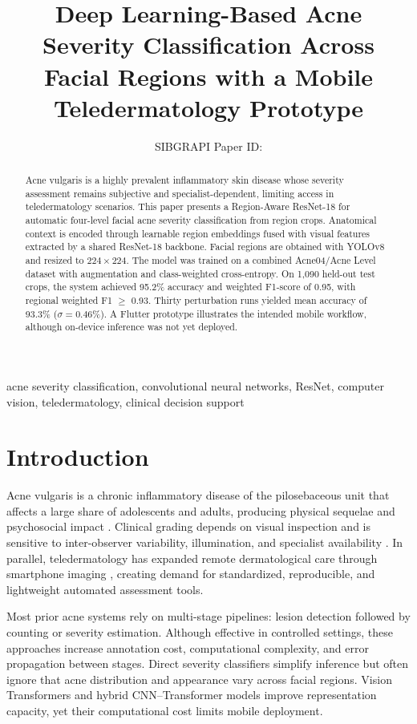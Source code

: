 \documentclass[10pt,conference]{IEEEtran}
\title{Deep Learning-Based Acne Severity Classification Across Facial Regions with a Mobile Teledermatology Prototype}
\author{
\IEEEauthorblockN{Lucas Gonzaga Andrade}
\IEEEauthorblockA{Federal Institute of Education, Science and Technology of Cear\'a (IFCE)\\
Fortaleza, CE, Brazil}
\and
\IEEEauthorblockN{Roger Moura Sarmento}
\IEEEauthorblockA{Federal Institute of Education, Science and Technology of Cear\'a (IFCE)\\
Fortaleza, CE, Brazil}
}
\author{SIBGRAPI Paper ID: \cmtid \\ }
\newif\iffinal
\begin{document}
\maketitle
\iffinal\else\linenumbers\fi

\begin{abstract}
Acne vulgaris is a highly prevalent inflammatory skin disease whose severity assessment remains subjective and specialist-dependent, limiting access in teledermatology scenarios. This paper presents a Region-Aware ResNet-18 for automatic four-level facial acne severity classification from region crops. Anatomical context is encoded through learnable region embeddings fused with visual features extracted by a shared ResNet-18 backbone. Facial regions are obtained with YOLOv8 and resized to $224\times224$. The model was trained on a combined Acne04/Acne Level dataset with augmentation and class-weighted cross-entropy. On 1{,}090 held-out test crops, the system achieved 95.2\% accuracy and weighted F1-score of 0.95, with regional weighted F1 $\geq$ 0.93. Thirty perturbation runs yielded mean accuracy of 93.3\% ($\sigma=0.46\%$). A Flutter prototype illustrates the intended mobile workflow, although on-device inference was not yet deployed.
\end{abstract}

\begin{IEEEkeywords}
acne severity classification, convolutional neural networks, ResNet, computer vision, teledermatology, clinical decision support
\end{IEEEkeywords}

\section{Introduction}
Acne vulgaris is a chronic inflammatory disease of the pilosebaceous unit that affects a large share of adolescents and adults, producing physical sequelae and psychosocial impact \cite{zaenglein2018acne,samuels2020acne,vallerand2018risk}. Clinical grading depends on visual inspection and is sensitive to inter-observer variability, illumination, and specialist availability \cite{hayashi2008grading}. In parallel, teledermatology has expanded remote dermatological care through smartphone imaging \cite{moreno2017teledermatology,tran2011mobile}, creating demand for standardized, reproducible, and lightweight automated assessment tools.

Most prior acne systems rely on multi-stage pipelines: lesion detection followed by counting or severity estimation. Although effective in controlled settings, these approaches increase annotation cost, computational complexity, and error propagation between stages. Direct severity classifiers simplify inference but often ignore that acne distribution and appearance vary across facial regions. Vision Transformers and hybrid CNN--Transformer models improve representation capacity, yet their computational cost limits mobile deployment.
\end{document}
